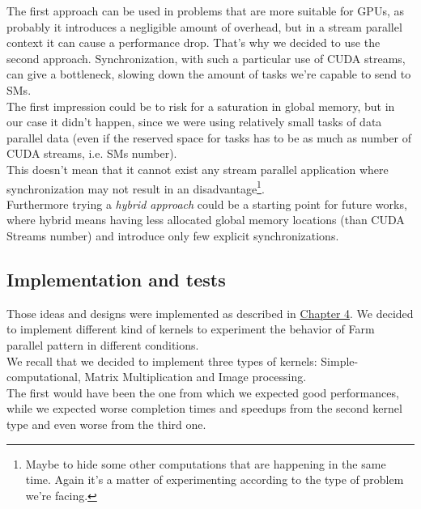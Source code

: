 The first approach can be used in problems that are more suitable for GPUs, as probably it introduces a negligible amount of overhead, but in a stream parallel context it can cause a performance drop.
 That's why we decided to use the second approach. Synchronization, with such a particular use of CUDA streams, can give a bottleneck, slowing down the amount of tasks we're capable to send to SMs.\\
 The first impression could be to risk for a saturation in global memory, but in our case it didn't happen, since we were using relatively small tasks of data parallel data (even if the reserved space for tasks has to be as much as number of CUDA streams, i.e. SMs number).\\
 This doesn't mean that it cannot exist any stream parallel application where synchronization may not result in an disadvantage\footnote{Maybe to hide some other computations that are happening in the same time. Again it's a matter of experimenting according to the type of problem we're facing.}.\\
 Furthermore trying a \textit{hybrid approach} could be a starting point for future works, where hybrid means having less allocated global memory locations (than CUDA Streams number) and introduce only few explicit synchronizations.\\
 
 
 \subsection{Implementation and tests}
 Those ideas and designs were implemented as described in \hyperref[chap:impl]{Chapter 4}. We decided to implement different kind of kernels to experiment the behavior of Farm parallel pattern in different conditions.\\
 We recall that we decided to implement three types of kernels: Simple-computational, Matrix Multiplication and Image processing.\\
 The first would have been the one from which we expected good performances, while we expected worse completion times and speedups from the second kernel type and even worse from the third one.
 
